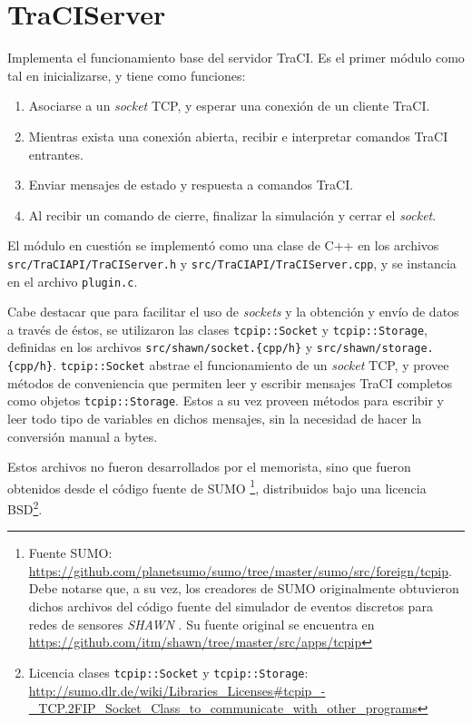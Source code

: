 \section{TraCIServer}\label{sec:traciserver}

Implementa el funcionamiento base del servidor TraCI. Es el primer módulo como tal en inicializarse, y tiene como funciones:

\begin{enumerate}
    \item Asociarse a un \emph{socket} TCP, y esperar una conexión de un cliente TraCI.
    \item Mientras exista una conexión abierta, recibir e interpretar comandos TraCI entrantes.
    \item Enviar mensajes de estado y respuesta a comandos TraCI.
    \item Al recibir un comando de cierre, finalizar la simulación y cerrar el \emph{socket}.
\end{enumerate}

El módulo en cuestión se implementó como una clase de C++ en los archivos \texttt{src/TraCIAPI/TraCIServer.h} y \texttt{src/TraCIAPI/TraCIServer.cpp}, y se instancia en el archivo \texttt{plugin.c}.

Cabe destacar que para facilitar el uso de \emph{sockets} y la obtención y envío de datos a través de éstos, se utilizaron las clases \texttt{tcpip::Socket} y \texttt{tcpip::Storage}, definidas en los archivos \texttt{src/shawn/socket.\{cpp/h\}} y \texttt{src/shawn/storage.\{cpp/h\}}. \texttt{tcpip::Socket} abstrae el funcionamiento de un \textit{socket} TCP, y provee métodos de conveniencia que permiten leer y escribir mensajes TraCI completos como objetos \texttt{tcpip::Storage}. Estos a su vez proveen métodos para escribir y leer todo tipo de variables en dichos mensajes, sin la necesidad de hacer la conversión manual a bytes.

Estos archivos no fueron desarrollados por el memorista, sino que fueron obtenidos desde el código fuente de SUMO \footnote{Fuente SUMO: \url{https://github.com/planetsumo/sumo/tree/master/sumo/src/foreign/tcpip}. Debe notarse que, a su vez, los creadores de SUMO originalmente obtuvieron dichos archivos del código fuente del simulador de eventos discretos para redes de sensores \emph{SHAWN} \cite{kroller2005shawn}. Su fuente original se encuentra en \url{https://github.com/itm/shawn/tree/master/src/apps/tcpip}}, distribuidos bajo una licencia BSD\footnote{Licencia clases \texttt{tcpip::Socket} y \texttt{tcpip::Storage}: \url{http://sumo.dlr.de/wiki/Libraries_Licenses\#tcpip_-_TCP.2FIP_Socket_Class_to_communicate_with_other_programs}}.

